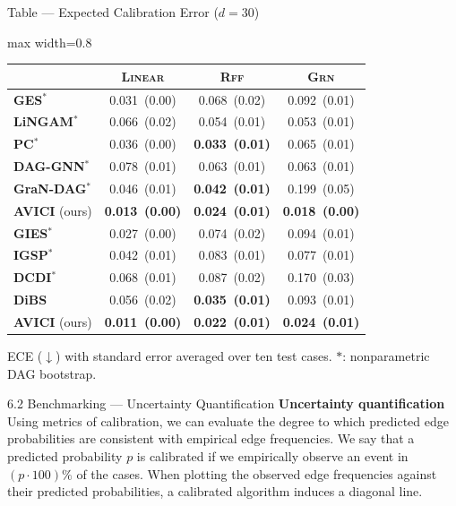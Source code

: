 \documentclass[aspectratio=169,10pt]{beamer}
\newcommand{\err}[1]{\tiny{$\,$(#1)}}
\newcommand{\highlight}[1]{\textbf{#1}}
\newcommand{\domain}[1]{\textsc{#1}}
\newcommand{\ges}{\textbf{GES}}
\newcommand{\pc}{\textbf{PC}}
\newcommand{\lingam}{\textbf{LiNGAM}}
\newcommand{\daggnn}{\textbf{DAG-GNN}}
\newcommand{\grandag}{\textbf{GraN-DAG}}
\newcommand{\oursobserv}{\textbf{AVICI} (ours)}
\newcommand{\gies}{\textbf{GIES}}
\newcommand{\igsp}{\textbf{IGSP}}
\newcommand{\dcdi}{\textbf{DCDI}}
\newcommand{\dibs}{\textbf{DiBS}}
\newcommand{\oursinterv}{\textbf{AVICI} (ours)}
\begin{document}
\begin{frame}{Table --- Expected Calibration Error ($d=30$)}
\begin{adjustbox}{max width=0.8\textwidth}
\begin{tabular}{lccc}
\toprule
& \domain{Linear} & {\domain{Rff}} & \domain{Grn} \\
\midrule
\ges${}^*$    &              0.031 \err{0.00} &              0.068 \err{0.02} &              0.092 \err{0.01} \\
\lingam${}^*$ &              0.066 \err{0.02} &              0.054 \err{0.01} &              0.053 \err{0.01} \\
\pc${}^*$     &              0.036 \err{0.00} &  \highlight{0.033 \err{0.01}} &              0.065 \err{0.01} \\
\daggnn${}^*$ &              0.078 \err{0.01} &              0.063 \err{0.01} &              0.063 \err{0.01} \\
\grandag${}^*$&              0.046 \err{0.01} &  \highlight{0.042 \err{0.01}} &              0.199 \err{0.05}\\
\oursobserv      &  \highlight{0.013 \err{0.00}} &  \highlight{0.024 \err{0.01}} &  \highlight{0.018 \err{0.00}} \\
\midrule
\gies${}^*$   &              0.027 \err{0.00} &              0.074 \err{0.02} &              0.094 \err{0.01} \\
\igsp${}^*$   &              0.042 \err{0.01} &              0.083 \err{0.01} &              0.077 \err{0.01} \\
\dcdi${}^*$   &              0.068 \err{0.01} &              0.087 \err{0.02} &              0.170 \err{0.03} \\
\dibs             &              0.056 \err{0.02} &  \highlight{0.035 \err{0.01}} &              0.093 \err{0.01} \\
\oursinterv      &  \highlight{0.011 \err{0.00}} &  \highlight{0.022 \err{0.01}} &  \highlight{0.024 \err{0.01}} \\
\bottomrule
\end{tabular}
\end{adjustbox}

\vspace{0.2cm}
{\footnotesize ECE ($\downarrow$) with standard error averaged over ten test cases. $*$: nonparametric DAG bootstrap.}
\end{frame}

\begin{frame}{6.2 Benchmarking --- Uncertainty Quantification}
\textbf{Uncertainty quantification}\quad
Using metrics of calibration, we can evaluate the degree to which predicted edge probabilities are consistent with empirical edge frequencies. We say that a predicted probability $p$ is calibrated if we empirically observe an event in $(p\cdot100)\%$ of the cases. When plotting the observed edge frequencies against their predicted probabilities, a calibrated algorithm induces a diagonal line.
\end{frame}
\end{document}
